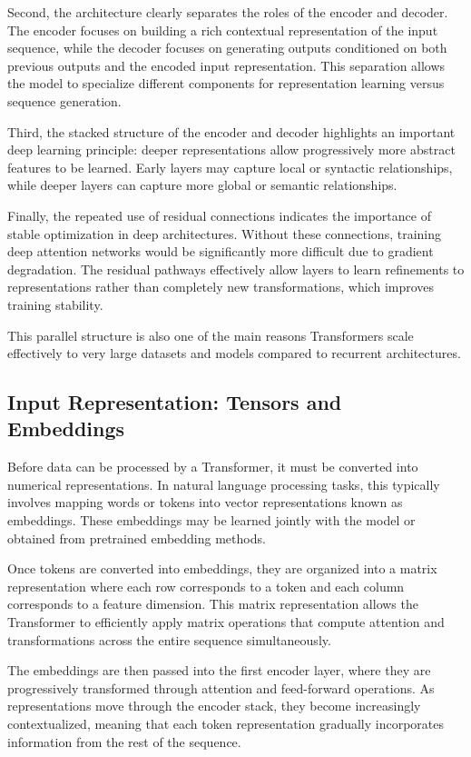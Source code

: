 \documentclass[11pt]{article}
\begin{document}
Second, the architecture clearly separates the roles of the encoder and decoder. The encoder focuses on building a rich contextual representation of the input sequence, while the decoder focuses on generating outputs conditioned on both previous outputs and the encoded input representation. This separation allows the model to specialize different components for representation learning versus sequence generation.

Third, the stacked structure of the encoder and decoder highlights an important deep learning principle: deeper representations allow progressively more abstract features to be learned. Early layers may capture local or syntactic relationships, while deeper layers can capture more global or semantic relationships.

Finally, the repeated use of residual connections indicates the importance of stable optimization in deep architectures. Without these connections, training deep attention networks would be significantly more difficult due to gradient degradation. The residual pathways effectively allow layers to learn refinements to representations rather than completely new transformations, which improves training stability.

This parallel structure is also one of the main reasons Transformers scale effectively to very large datasets and models compared to recurrent architectures.

\subsection{Input Representation: Tensors and Embeddings}

Before data can be processed by a Transformer, it must be converted into numerical representations. In natural language processing tasks, this typically involves mapping words or tokens into vector representations known as embeddings. These embeddings may be learned jointly with the model or obtained from pretrained embedding methods.

Once tokens are converted into embeddings, they are organized into a matrix representation where each row corresponds to a token and each column corresponds to a feature dimension. This matrix representation allows the Transformer to efficiently apply matrix operations that compute attention and transformations across the entire sequence simultaneously.

The embeddings are then passed into the first encoder layer, where they are progressively transformed through attention and feed-forward operations. As representations move through the encoder stack, they become increasingly contextualized, meaning that each token representation gradually incorporates information from the rest of the sequence.
\end{document}

